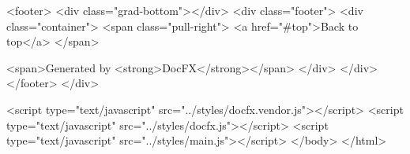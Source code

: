       <footer>
        <div class="grad-bottom"></div>
        <div class="footer">
          <div class="container">
            <span class="pull-right">
              <a href="#top">Back to top</a>
            </span>
            
            <span>Generated by <strong>DocFX</strong></span>
          </div>
        </div>
      </footer>
    </div>
    
    <script type="text/javascript" src="../styles/docfx.vendor.js"></script>
    <script type="text/javascript" src="../styles/docfx.js"></script>
    <script type="text/javascript" src="../styles/main.js"></script>
  </body>
</html>

